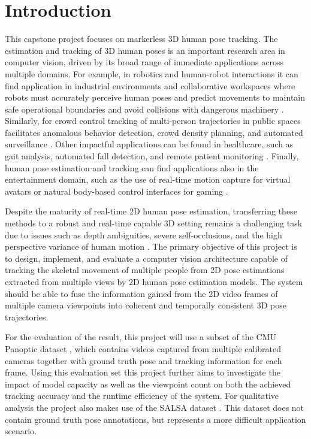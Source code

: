 
\section{Introduction} \label{into}

This capstone project focuses on markerless 3D human pose tracking. The estimation and tracking of 3D human poses is an important research area in computer vision, driven by its broad range of immediate applications across multiple domains. For example, in robotics and human-robot interactions it can find application in industrial environments and collaborative workspaces where robots must accurately perceive human poses and predict movements to maintain safe operational boundaries and avoid collisions with dangerous machinery \parencite{svenstrup2009pose,dondrup2015real,koppula2015anticipating}. Similarly, for crowd control tracking of multi-person trajectories in public spaces facilitates anomalous behavior detection, crowd density planning, and automated surveillance \parencite{sultani2018real,luo2021multiple}. Other impactful applications can be found in healthcare, such as gait analysis, automated fall detection, and remote patient monitoring \parencite{han2025comprehensive,gaya2024deep}. Finally, human pose estimation and tracking can find applications also in the entertainment domain, such as the use of real-time motion capture for virtual avatars or natural body-based control interfaces for gaming \parencite{mehta2020xnect}.

Despite the maturity of real-time 2D human pose estimation, transferring these methods to a robust and real-time capable 3D setting remains a challenging task due to issues such as depth ambiguities, severe self-occlusions, and the high perspective variance of human motion \parencite{zheng2023deep,nogueira2025markerless}. The primary objective of this project is to design, implement, and evaluate a computer vision architecture capable of tracking the skeletal movement of multiple people from 2D pose estimations extracted from multiple views by 2D human pose estimation models. The system should be able to fuse the information gained from the 2D video frames of multiple camera viewpoints into coherent and temporally consistent 3D pose trajectories.

For the evaluation of the result, this project will use a subset of the CMU Panoptic dataset \parencite{Joo_2015_ICCV,Joo_2017_TPAMI}, which contains videos captured from multiple calibrated cameras together with ground truth pose and tracking information for each frame. Using this evaluation set this project further aims to investigate the impact of model capacity as well as the viewpoint count on both the achieved tracking accuracy and the runtime efficiency of the system. For qualitative analysis the project also makes use of the SALSA dataset \parencite{alameda2015salsa}. This dataset does not contain ground truth pose annotations, but represents a more difficult application scenario.

